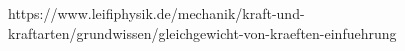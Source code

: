 \documentclass[preview]{standalone}
\begin{document}
\begin{center}
https://www.leifiphysik.de/mechanik/kraft-und-kraftarten/grundwissen/gleichgewicht-von-kraeften-einfuehrung
\end{center}
\end{document}
